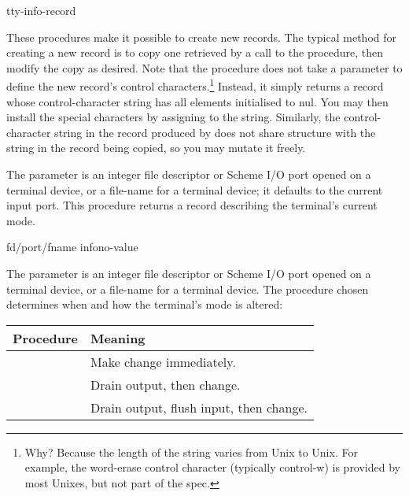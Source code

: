                    {tty-info-record}
\begin{desc}
These procedures make it possible to create new  records.
The typical method for creating a new record is to copy one retrieved
by a call to the  procedure, then modify the copy as desired.
Note that the  procedure does not take a parameter
to define the new record's control characters.\footnote{
        Why? Because the length of the string varies from Unix to Unix.
        For example, the word-erase control character (typically control-w)
        is provided by most Unixes, but not part of the {\Posix} spec.}
Instead, it simply returns a  record whose control-character
string has all elements initialised to {\Ascii} nul.
You may then install the special characters by assigning to the string.
Similarly, the control-character string in the record produced by
 does not share structure with the string in the record
being copied, so you may mutate it freely.
\end{desc}


\begin{desc}
The  parameter is an integer file descriptor or 
Scheme I/O port opened on a terminal device, 
or a file-name for a terminal device; it defaults to the current input port.
This procedure returns a  record describing the terminal's
current mode.
\end{desc}

  {fd/port/fname info}{no-value}
\begin{desc}
The  parameter is an integer file descriptor or 
Scheme I/O port opened on a terminal device, 
or a file-name for a terminal device.
The procedure chosen determines when and how the terminal's mode is altered:
\begin{center}
\begin{tabular}{|ll|} \hline
Procedure & Meaning \\ \hline \hline
\ex{set-tty-info/now}   & Make change immediately. \\
\ex{set-tty-info/drain} & Drain output, then change. \\
\ex{set-tty-info/flush} & Drain output, flush input, then change. \\ \hline
\end{tabular}
\end{center}
\end{desc}

